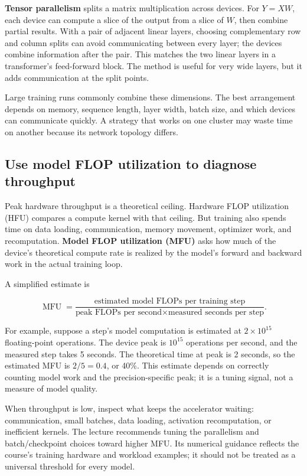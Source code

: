 \textbf{Tensor parallelism} splits a matrix multiplication across devices. For \(Y=XW\), each device can compute a slice of the output from a slice of \(W\), then combine partial results. With a pair of adjacent linear layers, choosing complementary row and column splits can avoid communicating between every layer; the devices combine information after the pair. This matches the two linear layers in a transformer's feed-forward block. The method is useful for very wide layers, but it adds communication at the split points.

Large training runs commonly combine these dimensions. The best arrangement depends on memory, sequence length, layer width, batch size, and which devices can communicate quickly. A strategy that works on one cluster may waste time on another because its network topology differs.

\subsection{Use model FLOP utilization to diagnose throughput}\label{04-visual-computing-ii-ch031-use-model-flop-utilization-to-diagnose-throughput}

\hypertarget{04-visual-computing-ii-ch031-use-model-flop-utilization-to-diagnose-throughput}{}

Peak hardware throughput is a theoretical ceiling. Hardware FLOP utilization (HFU) compares a compute kernel with that ceiling. But training also spends time on data loading, communication, memory movement, optimizer work, and recomputation. \textbf{Model FLOP utilization (MFU)} asks how much of the device's theoretical compute rate is realized by the model's forward and backward work in the actual training loop.

A simplified estimate is

\[
\operatorname{MFU}=\frac{\text{estimated model FLOPs per training step}}
{\text{peak FLOPs per second}\times\text{measured seconds per step}}.
\]

For example, suppose a step's model computation is estimated at \(2\times10^{15}\) floating-point operations. The device peak is \(10^{15}\) operations per second, and the measured step takes 5 seconds. The theoretical time at peak is 2 seconds, so the estimated MFU is \(2/5=0.4\), or 40\%. This estimate depends on correctly counting model work and the precision-specific peak; it is a tuning signal, not a measure of model quality.

When throughput is low, inspect what keeps the accelerator waiting: communication, small batches, data loading, activation recomputation, or inefficient kernels. The lecture recommends tuning the parallelism and batch/checkpoint choices toward higher MFU. Its numerical guidance reflects the course's training hardware and workload examples; it should not be treated as a universal threshold for every model.

